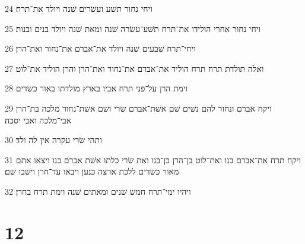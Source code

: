 \par 24 ויחי נחור תשׁע ועשׂרים שׁנה ויולד את־תרח׃
\par 25 ויחי נחור אחרי הולידו את־תרח תשׁע־עשׂרה שׁנה ומאת שׁנה ויולד בנים ובנות׃
\par 26 ויחי־תרח שׁבעים שׁנה ויולד את־אברם את־נחור ואת־הרן׃
\par 27 ואלה תולדת תרח תרח הוליד את־אברם את־נחור ואת־הרן והרן הוליד את־לוט׃
\par 28 וימת הרן על־פני תרח אביו בארץ מולדתו באור כשׂדים׃
\par 29 ויקח אברם ונחור להם נשׁים שׁם אשׁת־אברם שׂרי ושׁם אשׁת־נחור מלכה בת־הרן אבי־מלכה ואבי יסכה׃
\par 30 ותהי שׂרי עקרה אין לה ולד׃
\par 31 ויקח תרח את־אברם בנו ואת־לוט בן־הרן בן־בנו ואת שׂרי כלתו אשׁת אברם בנו ויצאו אתם מאור כשׂדים ללכת ארצה כנען ויבאו עד־חרן וישׁבו שׁם׃
\par 32 ויהיו ימי־תרח חמשׁ שׁנים ומאתים שׁנה וימת תרח בחרן׃

\chapter{12}

